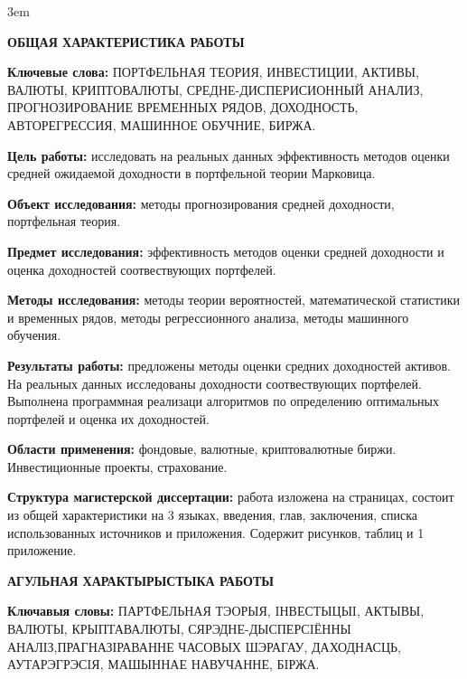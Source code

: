 \newpage
{}

\emergencystretch 3em

\begin{center}
	\textbf{\large ОБЩАЯ ХАРАКТЕРИСТИКА РАБОТЫ}
\end{center}


\textbf{Ключевые слова:}
ПОРТФЕЛЬНАЯ ТЕОРИЯ, ИНВЕСТИЦИИ, АКТИВЫ, ВАЛЮТЫ, КРИПТОВАЛЮТЫ, СРЕДНЕ-ДИСПЕРИСИОННЫЙ АНАЛИЗ, ПРОГНОЗИРОВАНИЕ ВРЕМЕННЫХ РЯДОВ,
ДОХОДНОСТЬ, АВТОРЕГРЕССИЯ, МАШИННОЕ ОБУЧНИЕ, БИРЖА.

\textbf{Цель работы:}
исследовать на реальных данных эффективность методов оценки средней ожидаемой доходности в портфельной теории Марковица.

\textbf{Объект исследования:} 
методы прогнозирования средней доходности, портфельная теория.

\textbf{Предмет исследования:}
эффективность методов оценки средней доходности и оценка доходностей соотвествующих портфелей.

\textbf{Методы исследования:}
методы теории вероятностей, математической статистики и временных рядов, методы регрессионного анализа, методы машинного обучения.

\textbf{Результаты работы:}
предложены методы оценки средних доходностей активов. На реальных данных исследованы доходности соотвествующих портфелей.
Выполнена программная реализаци алгоритмов по определению оптимальных портфелей и оценка их доходностей.

\textbf{Области применения:}
фондовые, валютные, криптовалютные биржи. Инвестиционные проекты, страхование.

\textbf{Структура магистерской диссертации:}
работа изложена на \pageref{LastPage} страницах, состоит из общей характеристики на 3 языках, введения, 
\totalchapters{} глав, заключения, списка использованных источников и приложения.
Содержит \totalfigures{} рисунков, \totaltables{} таблиц и 1 приложение.

\newpage
{}
\begin{center}
	\textbf{\large АГУЛЬНАЯ ХАРАКТЫРЫСТЫКА РАБОТЫ}
\end{center}

\textbf{Ключавыя словы:}
ПАРТФЕЛЬНАЯ ТЭОРЫЯ, IНВЕСТЫЦЫI, АКТЫВЫ, ВАЛЮТЫ, КРЫПТАВАЛЮТЫ, СЯРЭДНЕ-ДЫСПЕРСIЁННЫ АНАЛІЗ,ПРАГНАЗІРАВАННЕ ЧАСОВЫХ ШЭРАГАУ,
ДАХОДНАСЦЬ, АУТАРЭГРЭСIЯ, МАШЫННАЕ НАВУЧАННЕ, БIРЖА.

